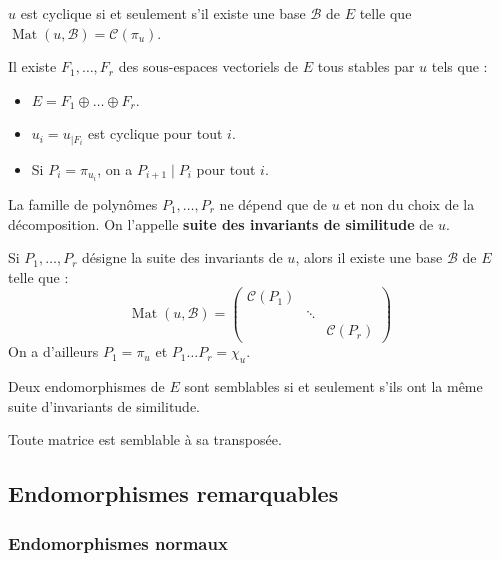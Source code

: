   \begin{proposition}
    $u$ est cyclique si et seulement s'il existe une base $\mathcal{B}$ de $E$ telle que $\operatorname{Mat}(u, \mathcal{B}) = \mathcal{C}(\pi_u)$.
  \end{proposition}

  \begin{theorem}
    Il existe $F_1, \dots, F_r$ des sous-espaces vectoriels de $E$ tous stables par $u$ tels que :
    \begin{itemize}
      \item $E = F_1 \oplus \dots \oplus F_r$.
      \item $u_i = u_{|F_i}$ est cyclique pour tout $i$.
      \item Si $P_i = \pi_{u_i}$, on a $P_{i+1} \mid P_i$ pour tout $i$.
    \end{itemize}
    La famille de polynômes $P_1, \dots, P_r$ ne dépend que de $u$ et non du choix de la décomposition. On l'appelle \textbf{suite des invariants de similitude} de $u$.
  \end{theorem}

  \begin{theorem}
    Si $P_1, \dots, P_r$ désigne la suite des invariants de $u$, alors il existe une base $\mathcal{B}$ de $E$ telle que :
    \[ \operatorname{Mat}(u, \mathcal{B}) = \begin{pmatrix} \mathcal{C}(P_1) & & \\ & \ddots & \\ & & \mathcal{C}(P_r) \end{pmatrix} \]
    On a d'ailleurs $P_1 = \pi_u$ et $P_1 \dots P_r = \chi_u$.
  \end{theorem}

  \begin{corollary}
    Deux endomorphismes de $E$ sont semblables si et seulement s'ils ont la même suite d'invariants de similitude.
  \end{corollary}

  \begin{application}
    Toute matrice est semblable à sa transposée.
  \end{application}

  \subsection{Endomorphismes remarquables}

  \subsubsection{Endomorphismes normaux}

